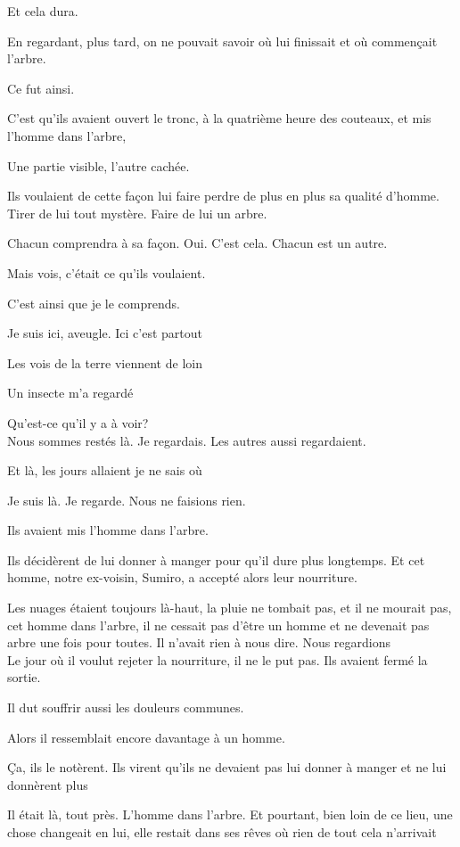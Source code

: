 Et cela dura.

En regardant, plus tard, on ne pouvait savoir où lui finissait et où
commençait l'arbre.

Ce fut ainsi.

C'est qu'ils avaient ouvert le tronc, à la quatrième heure des couteaux,
et mis l'homme dans l'arbre,

Une partie visible, l'autre cachée.

Ils voulaient de cette façon lui faire perdre de plus en plus sa qualité
d'homme. Tirer de lui tout mystère. Faire de lui un arbre.

Chacun comprendra à sa façon. Oui. C'est cela. Chacun est un autre.

Mais vois, c'était ce qu'ils voulaient.

C'est ainsi que je le comprends.

Je suis ici, aveugle. Ici c'est partout

Les vois de la terre viennent de loin

Un insecte m'a regardé

Qu'est-ce qu'il y a à voir?\\

Nous sommes restés là. Je regardais. Les autres aussi regardaient.

Et là, les jours allaient je ne sais où

Je suis là. Je regarde. Nous ne faisions rien.

Ils avaient mis l'homme dans l'arbre.

Ils décidèrent de lui donner à manger pour qu'il dure plus longtemps. Et
cet homme, notre ex-voisin, Sumiro, a accepté alors leur nourriture.

Les nuages étaient toujours là-haut, la pluie ne tombait pas, et il ne
mourait pas, cet homme dans l'arbre, il ne cessait pas d'être un homme
et ne devenait pas arbre une fois pour toutes. Il n'avait rien à nous
dire. Nous regardions\\

Le jour où il voulut rejeter la nourriture, il ne le put pas. Ils
avaient fermé la sortie.

Il dut souffrir aussi les douleurs communes.

Alors il ressemblait encore davantage à un homme.

Ça, ils le notèrent. Ils virent qu'ils ne devaient pas lui donner à
manger et ne lui donnèrent plus

Il était là, tout près. L'homme dans l'arbre. Et pourtant, bien loin de
ce lieu, une chose changeait en lui, elle restait dans ses rêves où rien
de tout cela n'arrivait

